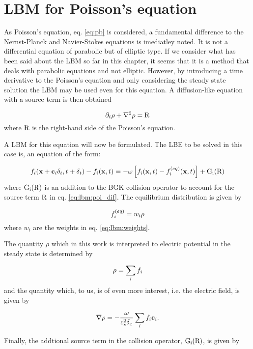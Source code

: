 \section{LBM for Poisson's equation}
As Poisson's equation, eq. \eqref{eq:pb} is considered, a fundamental
difference to the Nernst-Planck and Navier-Stokes equations is
imediatley noted. It is not a differential equation of parabolic but
of elliptic type. If we consider what has been said about the LBM so
far in this chapter, it seems that it is a method that deals with
parabolic equations and not elliptic. However, by introducing a time
derivative to the Poisson's equation and only considering the steady state
solution the LBM may be used even for this equation. A diffusion-like
equation with a source term is then obtained

\begin{equation}\label{eq:lbm:poi_dif}
\partial_t\rho + \nabla^2 \rho = \mathrm{R}
\end{equation}
where $\mathrm{R}$ is the right-hand side of the Poisson's equation.

A LBM for this equation will now be formulated. The LBE to be solved
in this case is, an equation of the form:

\begin{equation}
f_i(\mathbf{x} + \mathbf{c}_i\delta_t, t + \delta_t) - f_i(\mathbf{x}, t) = -\omega \left[
  f_i(\mathbf{x}, t) - f_i^{(eq)}(\mathbf{x}, t) \right] + \mathrm{G_i}(\mathrm{R})
\end{equation}
where $\mathrm{G_i}(\mathrm{R})$ is an addition to the BGK collision operator to account
for the source term $\mathrm{R}$ in eq. \eqref{eq:lbm:poi_dif}. The equilibrium
distribution is given by

\begin{equation}
f_i^{(eq)} = w_i \rho
\end{equation}
where $w_i$ are the weights in eq. \eqref{eq:lbm:weights}.

The quantity $\rho$ which in this work is interpreted to electric
potential in the steady state is determined by

\begin{equation}
\rho = \sum_i f_i
\end{equation}
and the quantity which, to us, is of even more interest, i.e. the
electric field, is given by

\begin{equation}
\nabla \rho = - \frac{\omega}{c_s^2 \delta_x} \sum_i f_i \mathbf{c}_i.
\end{equation}

Finally, the addtional source term in the collision operator, $\mathrm{G_i}(\mathrm{R})$,
is given by

